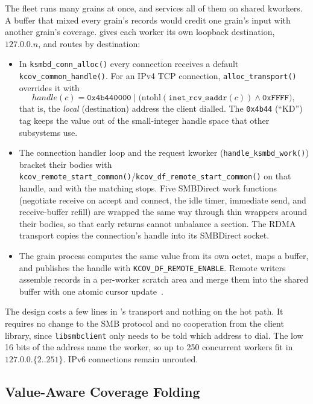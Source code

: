 \documentclass{article}
\begin{document}
The fleet runs many grains at once, and \ksmbd services all of them on shared
kworkers. A buffer that mixed every grain's records would credit one grain's
input with another grain's coverage. \toolname gives each worker its own
loopback destination, $127.0.0.n$, and routes by destination:
\begin{itemize}[nosep]
  \item In \texttt{ksmbd\_conn\_alloc()} every connection receives a default
        \texttt{kcov\_common\_handle()}. For an IPv4 TCP connection,
        \texttt{alloc\_transport()} overrides it with
        \[ \mathit{handle}(c) = \texttt{0x4b440000} \;\big|\; \big(\mathrm{ntohl}(\texttt{inet\_rcv\_saddr}(c)) \wedge \texttt{0xFFFF}\big), \]
        that is, the \emph{local} (destination) address the client dialled.
        The \texttt{0x4b44} (``KD'') tag keeps the value out of the
        small-integer handle space that other subsystems use.
  \item The connection handler loop and the request kworker
        (\texttt{handle\_ksmbd\_work()}) bracket their bodies with
        \texttt{kcov\_remote\_start\_common()}/\texttt{kcov\_df\_remote\_start\_common()}
        on that handle, and with the matching stops. Five SMBDirect work
        functions (negotiate receive on accept and connect, the idle timer,
        immediate send, and receive-buffer refill) are wrapped the same way
        through thin wrappers around their bodies, so that early returns
        cannot unbalance a section. The RDMA transport copies the
        connection's handle into its SMBDirect socket.
  \item The grain process computes the same value from its own octet, maps
        a \kcovdf buffer, and publishes the handle with
        \texttt{KCOV\_DF\_REMOTE\_ENABLE}. Remote writers assemble records in
        a per-worker scratch area and merge them into the shared buffer with
        one atomic cursor update~\cite{kim2026kcovdataflow}.
\end{itemize}
The design costs a few lines in \ksmbd's transport and nothing on the hot
path. It requires no change to the SMB protocol and no cooperation from the
client library, since \texttt{libsmbclient} only needs to be told which
address to dial. The low 16 bits of the address name the worker, so up to
250 concurrent workers fit in $127.0.0.\{2..251\}$. IPv6 connections remain
unrouted.

\subsection{Value-Aware Coverage Folding}\label{sec:fold}
\end{document}
